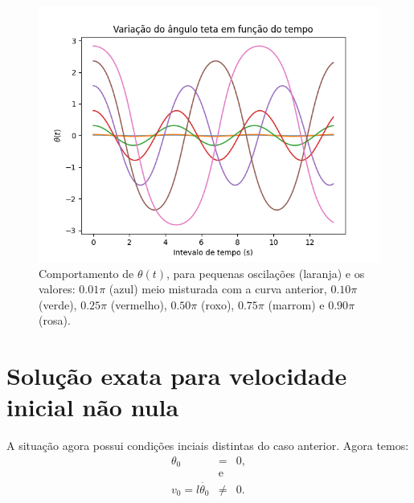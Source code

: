 \documentclass[12pt,openright,twoside,english,brazil]{abntex2}
\begin{document}


\begin{figure}[h]
 \centering
 \includegraphics[width=1.0\linewidth]{teta-tudo.png}
 \caption{Comportamento de $\theta(t)$, para pequenas oscilações (laranja) e os valores: $0.01\pi$ (azul) meio misturada com a curva anterior, $0.10\pi$ (verde), $0.25\pi$ (vermelho), $0.50\pi$ (roxo), $0.75\pi$ (marrom) e $0.90\pi$ (rosa).}
 \label{Figura8}
\end{figure}


\section{Solução exata para velocidade inicial não nula}
A situação agora possui condições inciais distintas do caso anterior. Agora temos:
\begin{eqnarray}
 \theta_0 & = & 0, \nonumber \\
 & \mbox{e} & \nonumber \\
 v_0  = l \dot{\theta_0} & \neq & 0. \nonumber
\end{eqnarray}
\end{document}
